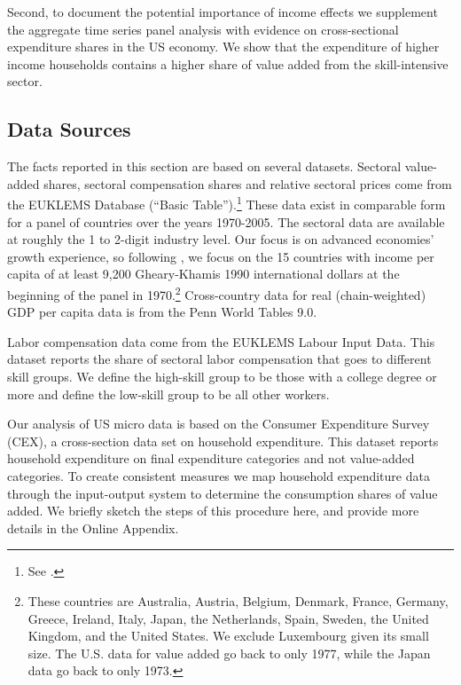 \documentclass[12pt,english]{article}
\begin{document}
Second, to document the potential importance of income effects we supplement
the aggregate time series panel analysis with evidence on cross-sectional
expenditure shares in the US economy. We show that the expenditure of higher
income households contains a higher share of value added from the
skill-intensive sector.

\subsection{Data Sources}

The facts reported in this section are based on several datasets. Sectoral
value-added shares, sectoral compensation shares and relative sectoral
prices come from the EUKLEMS Database (\textquotedblleft Basic
Table\textquotedblright ).\footnote{%
See \citet{OMaTim09}.} These data exist in comparable form for a panel of
countries over the years 1970-2005. The sectoral data are available at
roughly the 1 to 2-digit industry level. Our focus is on advanced economies'
growth experience, so following \citet{BueKab12}, we focus on the 15
countries with income per capita of at least 9,200 Gheary-Khamis 1990
international dollars at the beginning of the panel in 1970.\footnote{%
These countries are Australia, Austria, Belgium, Denmark, France, Germany,
Greece, Ireland, Italy, Japan, the Netherlands, Spain, Sweden, the United
Kingdom, and the United States. We exclude Luxembourg given its small size.
The U.S. data for value added go back to only 1977, while the Japan data go
back to only 1973.} Cross-country data for real (chain-weighted) GDP per
capita data is from the Penn World Tables 9.0.

Labor compensation data come from the EUKLEMS Labour Input Data. This
dataset reports the share of sectoral labor compensation that goes to
different skill groups. We define the high-skill group to be those with a
college degree or more and define the low-skill group to be all other
workers.

Our analysis of US micro data is based on the Consumer Expenditure Survey
(CEX), a cross-section data set on household expenditure. This dataset
reports household expenditure on final expenditure categories and not
value-added categories. To create consistent measures we map household
expenditure data through the input-output system to determine the
consumption shares of value added. We briefly sketch the steps of this
procedure here, and provide more details in the Online Appendix.
\end{document}

